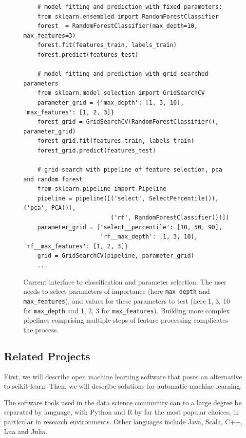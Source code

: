 \begin{figure}
    \begin{verbatim}
    # model fitting and prediction with fixed parameters:
    from sklearn.ensembled import RandomForestClassifier
    forest  = RandomForestClassifier(max_depth=10, max_features=3)
    forest.fit(features_train, labels_train)
    forest.predict(features_test)

    # model fitting and prediction with grid-searched parameters
    from sklearn.model_selection import GridSearchCV
    parameter_grid = {'max_depth': [1, 3, 10], 'max_features': [1, 2, 3]}
    forest_grid = GridSearchCV(RandomForestClassifier(), parameter_grid)
    forest_grid.fit(features_train, labels_train)
    forest_grid.predict(features_test)

    # grid-search with pipeline of feature selection, pca and random forest
    from sklearn.pipeline import Pipeline
    pipeline = pipeline([('select', SelectPercentile()), ('pca', PCA()),
                         ('rf', RandomForestClassifier())])
    parameter_grid = {'select__percentile': [10, 50, 90],
                      'rf__max_depth': [1, 3, 10], 'rf__max_features': [1, 2, 3]}
    grid = GridSearchCV(pipeline, parameter_grid)
    ... 
    \end{verbatim}
    \vspace{-5mm}
    \label{gridsearch}
    \caption{Current interface to \sklearn{} classification and parameter
        selection. The user needs to select parameters of importance (here
        \texttt{max\_depth} and \texttt{max\_features}), and values for these
        parameters to test (here 1, 3, 10 for \texttt{max\_depth} and 1, 2, 3
        for \texttt{max\_features}). Building more complex pipelines comprising
        multiple steps of feature processing complicates the process.}
\end{figure}

\subsection{Related Projects}
First, we will describe open machine learning software that poses an alternative to scikit-learn.
Then, we will describe solutions for automatic machine learning.

The software tools used in the data science community can to a large degree be
separated by language, with Python and R by far the most popular choices, in
particular in research environments. Other languages include Java, Scala, C++, Lua and Julia.

